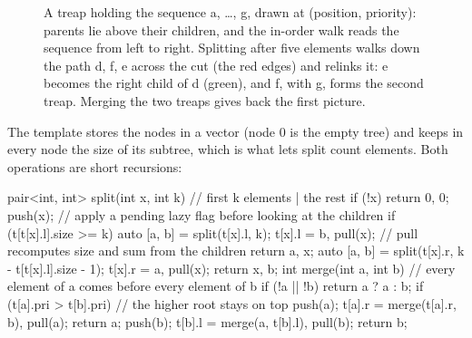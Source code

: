 \begin{figure}[htbp]
\centering
{}
\caption{A treap holding the sequence a, \dots, g, drawn at (position, priority): parents lie above their children, and the
in-order walk reads the sequence from left to right. Splitting after five elements walks down the path d, f, e across the cut
(the red edges) and relinks it: e becomes the right child of d (green), and f, with g, forms the second treap. Merging the two
treaps gives back the first picture.}
\label{fig:treap}
\end{figure}

The template stores the nodes in a vector (node 0 is the empty tree) and keeps in every node the size of its subtree, which is what
lets split count elements. Both operations are short recursions:

\begin{code}
pair<int, int> split(int x, int k) {  // first k elements | the rest
    if (!x) return {0, 0};
    push(x);  // apply a pending lazy flag before looking at the children
    if (t[t[x].l].size >= k) {
        auto [a, b] = split(t[x].l, k);
        t[x].l = b, pull(x);  // pull recomputes size and sum from the children
        return {a, x};
    }
    auto [a, b] = split(t[x].r, k - t[t[x].l].size - 1);
    t[x].r = a, pull(x);
    return {x, b};
}
int merge(int a, int b) {  // every element of a comes before every element of b
    if (!a || !b) return a ? a : b;
    if (t[a].pri > t[b].pri) {  // the higher root stays on top
        push(a);
        t[a].r = merge(t[a].r, b), pull(a);
        return a;
    }
    push(b);
    t[b].l = merge(a, t[b].l), pull(b);
    return b;
}
\end{code}

